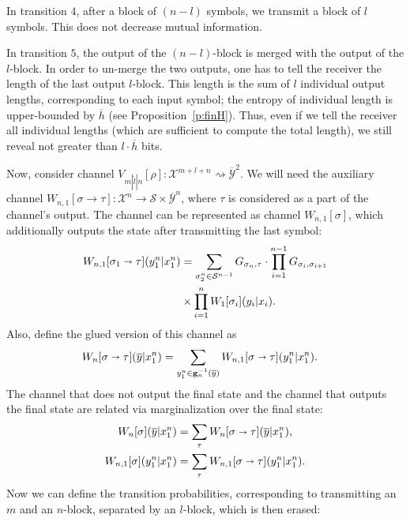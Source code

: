 \documentclass[journal, twocol]{IEEEtran}
\newcommand{\oh}{{\overline{h}}}
\newcommand{\tl}{{\widetilde{l}}}
\newcommand{\oy}{{\overline{y}}}
\newcommand{\mS}{{\mathcal{S}}}
\newcommand{\mX}{{\mathcal{X}}}
\newcommand{\omY}{{\overline{\mathcal{Y}}}}
\newcommand{\tosq}{\rightsquigarrow}
\newcommand{\toshort}{\shortrightarrow}
\newcommand{\bg}{\mathbf{g}}
\begin{document}
In transition $4$, after a block of $(n-l)$ symbols, we transmit a block of $l$ symbols. This does not decrease mutual information.

In transition $5$, the output of the $(n-l)$-block is merged with the output of the $l$-block.
In order to un-merge the two outputs, one has to tell the receiver the length of the last output $l$-block.
This length is the sum of $l$ individual output lengths, corresponding to each input symbol; the entropy of individual length is upper-bounded by $\oh$ (see Proposition~\ref{p:finH}).
Thus, even if we tell the receiver all individual lengths (which are sufficient to compute the total length), we still reveal not greater than $l\cdot \oh$ bits.

Now, consider channel $V_{m|\tl|n}[\rho]:\mX^{m+l+n}\tosq \omY^2$.
We will need the auxiliary channel $W_{n,1}[\sigma\to\tau]:\mX^n\to\mS\times\omY^n$, where $\tau$ is considered as a part of the channel's output.
The channel can be represented as channel $W_{n,1}[\sigma]$, which additionally outputs the state after transmitting the last symbol:
\begin{align}
W_{n,1}[\sigma_1\toshort\tau](y_1^n|x_1^n)&=
\sum_{\sigma_2^n\in\mS^{n-1}} 
G_{\sigma_n,\tau} \cdot
\prod_{i=1}^{n-1} G_{\sigma_{i},\sigma_{i+1}}
\nonumber\\
&\times
\prod_{i=1}^n W_1[\sigma_i](y_i|x_i).
\label{eq:Wn1st}
\end{align}
Also, define the glued version of this channel as
\begin{align}
W_n[\sigma\toshort\tau](\oy|x_1^n)&=\sum_{y_1^n\in \bg_n^{-1}(\oy)}W_{n,1}[\sigma\toshort\tau](y_1^n|x_1^n).
\label{eq:Wnst}
\end{align}
The channel that does not output the final state and the channel that outputs the final state are related via marginalization over the final state:
\begin{align}
W_n[\sigma](\oy|x_1^n)&=\sum_\tau W_n[\sigma\toshort\tau](\oy|x_1^n),
\label{eq:Wnsigma}
\\
W_{n,1}[\sigma](y_1^n|x_1^n)&=\sum_\tau W_{n,1}[\sigma\toshort\tau](y_1^n|x_1^n).
\label{eq:Wn1sigma}
\end{align}
Now we can define the transition probabilities, corresponding to transmitting an $m$ and an $n$-block, separated by an $l$-block, which is then erased:
\end{document}
